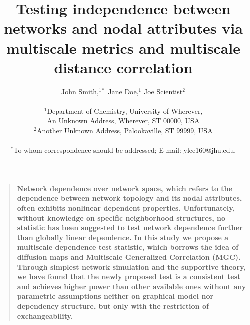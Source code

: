 \documentclass[12pt]{article}
\title{Testing independence between networks and nodal attributes via multiscale metrics and multiscale distance correlation}
\author
{John Smith,$^{1\ast}$ Jane Doe,$^{1}$ Joe Scientist$^{2}$\\
\\
\normalsize{$^{1}$Department of Chemistry, University of Wherever,}\\
\normalsize{An Unknown Address, Wherever, ST 00000, USA}\\
\normalsize{$^{2}$Another Unknown Address, Palookaville, ST 99999, USA}\\
\\
\normalsize{$^\ast$To whom correspondence should be addressed; E-mail:  ylee160@jhu.edu.}
}
\date{}
\theoremstyle{definition}
\newenvironment{sciabstract}{%
\begin{quote} \bf}
{\end{quote}}
\begin{document}
 


\baselineskip24pt


\maketitle 


\begin{sciabstract}
 Network dependence over network space, which refers to the dependence between network topology and its nodal attributes, often exhibits nonlinear dependent properties. Unfortunately, without knowledge on specific neighborhood structures, no statistic has been suggested to test network dependence further than globally linear dependence. In this study we propose a multiscale dependence test statistic, which borrows the idea of diffusion maps and Multiscale Generalized Correlation (MGC). Through simplest network simulation and the supportive theory, we have found that the newly proposed test is a consistent test and achieves higher power than other available ones without any parametric assumptions neither on graphical model nor dependency structure, but only with the restriction of exchangeability. 
\end{sciabstract}

\newpage
\tableofcontents
\end{document}
